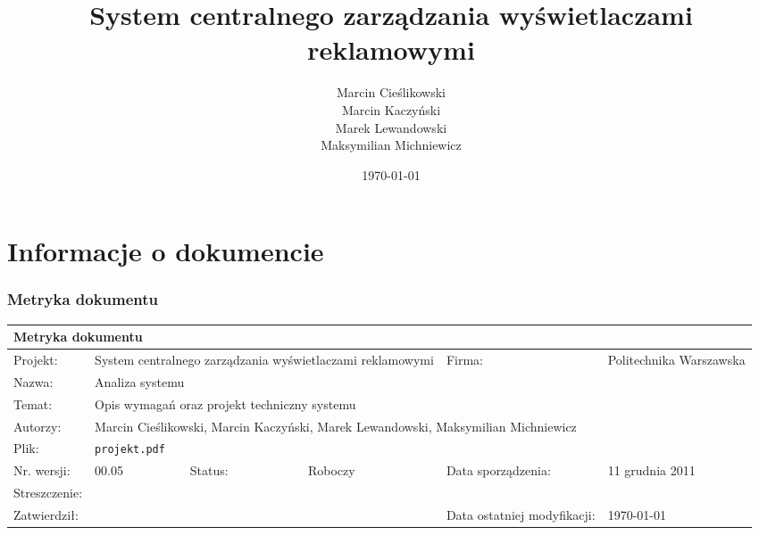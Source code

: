 \documentclass[10pt,a4paper,titlepage]{article} %
\begin{document}
	

	\title{System centralnego zarządzania wyświetlaczami reklamowymi}
	\author{Marcin Cieślikowski\\
		Marcin Kaczyński\\
		Marek Lewandowski\\
		Maksymilian Michniewicz\\}
	\date{\today}
	\maketitle
	
	\section*{Informacje o dokumencie}
	
	\subsubsection*{Metryka dokumentu}
		\begin{table}[h]
		\begin{tabular}{|p{2cm}|p{2cm}|p{2cm}|p{2cm}|m{3cm}|m{2cm}|}
			\hline \multicolumn{6}{|l|}{Metryka dokumentu} \\ 
			\hline
			\hline Projekt: & \multicolumn{3}{|m{6cm}|}{System centralnego zarządzania wyświetlaczami reklamowymi}  & Firma: & Politechnika Warszawska \\ 
			\hline Nazwa: & \multicolumn{5}{|l|}{Analiza systemu}  \\ 
			\hline Temat: & \multicolumn{5}{|l|}{Opis wymagań oraz projekt techniczny systemu}  \\ 
			\hline Autorzy: & \multicolumn{5}{|l|}{Marcin Cieślikowski, Marcin Kaczyński, Marek Lewandowski, Maksymilian Michniewicz}  \\ 
			\hline Plik: &  \multicolumn{5}{|l|}{\texttt{projekt.pdf}} \\ 
			\hline Nr. wersji: & \multicolumn{1}{|l|}{00.05} & Status: & Roboczy  & Data sporządzenia: & 11 grudnia 2011 \\ 
			\hline Streszczenie:  & \multicolumn{5}{|l|}{}  \\ %
			\hline Zatwierdził: & \multicolumn{3}{|l|}{} & Data ostatniej modyfikacji: & \today \\ 
			\hline 
		\end{tabular} 
		\end{table}
\end{document}
